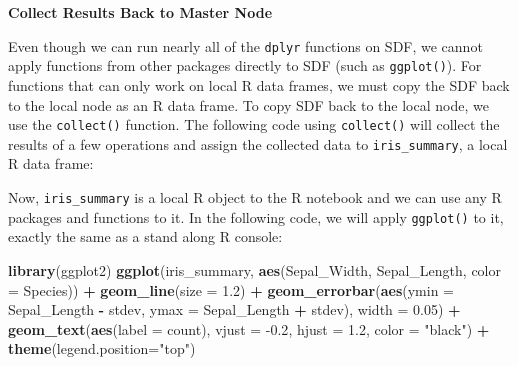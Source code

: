 \documentclass[12pt,]{krantz}
\makeatletter
\newenvironment{Shaded}{\begin{snugshade}}{\end{snugshade}}
\newcommand{\DataTypeTok}[1]{\textcolor[rgb]{0.27,0.27,0.27}{#1}}
\newcommand{\DecValTok}[1]{\textcolor[rgb]{0.06,0.06,0.06}{#1}}
\newcommand{\FloatTok}[1]{\textcolor[rgb]{0.06,0.06,0.06}{#1}}
\newcommand{\KeywordTok}[1]{\textcolor[rgb]{0.27,0.27,0.27}{\textbf{#1}}}
\newcommand{\NormalTok}[1]{#1}
\newcommand{\OperatorTok}[1]{\textcolor[rgb]{0.43,0.43,0.43}{\textbf{#1}}}
\newcommand{\StringTok}[1]{\textcolor[rgb]{0.5,0.5,0.5}{#1}}
\newenvironment{kframe}{%
\medskip{}
\setlength{\fboxsep}{.8em}
 \def\at@end@of@kframe{}%
 \ifinner\ifhmode%
  \def\at@end@of@kframe{\end{minipage}}%
  \begin{minipage}{\columnwidth}%
 \fi\fi%
 \def\FrameCommand##1{\hskip\@totalleftmargin \hskip-\fboxsep
 \colorbox{shadecolor}{##1}\hskip-\fboxsep
     \hskip-\linewidth \hskip-\@totalleftmargin \hskip\columnwidth}%
 \MakeFramed {\advance\hsize-\width
   \@totalleftmargin\z@ \linewidth\hsize
   \@setminipage}}%
 {\par\unskip\endMakeFramed%
 \at@end@of@kframe}
\renewenvironment{Shaded}{\begin{kframe}}{\end{kframe}}
\makeatother
\begin{document}
\textbf{Collect Results Back to Master Node}

Even though we can run nearly all of the \texttt{dplyr} functions on SDF, we cannot apply functions from other packages directly to SDF (such as \texttt{ggplot()}). For functions that can only work on local R data frames, we must copy the SDF back to the local node as an R data frame. To copy SDF back to the local node, we use the \texttt{collect()} function. The following code using \texttt{collect()} will collect the results of a few operations and assign the collected data to \texttt{iris\_summary}, a local R data frame:

\begin{Shaded}
\end{Shaded}

Now, \texttt{iris\_summary} is a local R object to the R notebook and we can use any R packages and functions to it. In the following code, we will apply \texttt{ggplot()} to it, exactly the same as a stand along R console:

\begin{Shaded}
\begin{Highlighting}[]
\KeywordTok{library}\NormalTok{(ggplot2)}
\KeywordTok{ggplot}\NormalTok{(iris_summary, }\KeywordTok{aes}\NormalTok{(Sepal_Width, Sepal_Length, }\DataTypeTok{color =}\NormalTok{ Species)) }\OperatorTok{+}
\StringTok{  }\KeywordTok{geom_line}\NormalTok{(}\DataTypeTok{size =} \FloatTok{1.2}\NormalTok{) }\OperatorTok{+}
\StringTok{  }\KeywordTok{geom_errorbar}\NormalTok{(}\KeywordTok{aes}\NormalTok{(}\DataTypeTok{ymin =}\NormalTok{ Sepal_Length }\OperatorTok{-}\StringTok{ }\NormalTok{stdev, }
                    \DataTypeTok{ymax =}\NormalTok{ Sepal_Length }\OperatorTok{+}\StringTok{ }\NormalTok{stdev), }\DataTypeTok{width =} \FloatTok{0.05}\NormalTok{) }\OperatorTok{+}
\StringTok{  }\KeywordTok{geom_text}\NormalTok{(}\KeywordTok{aes}\NormalTok{(}\DataTypeTok{label =}\NormalTok{ count), }\DataTypeTok{vjust =} \FloatTok{-0.2}\NormalTok{, }\DataTypeTok{hjust =} \FloatTok{1.2}\NormalTok{, }\DataTypeTok{color =} \StringTok{"black"}\NormalTok{) }\OperatorTok{+}
\StringTok{  }\KeywordTok{theme}\NormalTok{(}\DataTypeTok{legend.position=}\StringTok{"top"}\NormalTok{)}
\end{Highlighting}
\end{Shaded}
\end{document}

